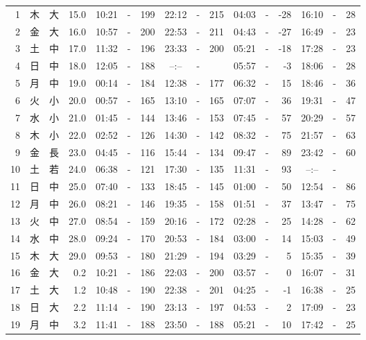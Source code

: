 \documentclass[12pt.a4j]{jsarticle}
\begin{document}
\begin{center}
\begin{table}[ht]
\begin{tabular}{|rc|cr|ccrccr|ccrccr|}
 \hline
 1 & 木 & 大 & 15.0 &  10:21 &-& 199  &  22:12 &-& 215  &   04:03 &-& -28  &   16:10 &-&  28  \\
 2 & 金 & 大 & 16.0 &  10:57 &-& 200  &  22:53 &-& 211  &   04:43 &-& -27  &   16:49 &-&  23  \\
 3 & 土 & 中 & 17.0 &  11:32 &-& 196  &  23:33 &-& 200  &   05:21 &-& -18  &   17:28 &-&  23  \\
 4 & 日 & 中 & 18.0 &  12:05 &-& 188  &  --:-- &-&     &   05:57 &-&  -3  &   18:06 &-&  28  \\
 5 & 月 & 中 & 19.0 &  00:14 &-& 184  &  12:38 &-& 177  &   06:32 &-&  15  &   18:46 &-&  36  \\
 6 & 火 & 小 & 20.0 &  00:57 &-& 165  &  13:10 &-& 165  &   07:07 &-&  36  &   19:31 &-&  47  \\
 7 & 水 & 小 & 21.0 &  01:45 &-& 144  &  13:46 &-& 153  &   07:45 &-&  57  &   20:29 &-&  57  \\
 8 & 木 & 小 & 22.0 &  02:52 &-& 126  &  14:30 &-& 142  &   08:32 &-&  75  &   21:57 &-&  63  \\
 9 & 金 & 長 & 23.0 &  04:45 &-& 116  &  15:44 &-& 134  &   09:47 &-&  89  &   23:42 &-&  60  \\
10 & 土 & 若 & 24.0 &  06:38 &-& 121  &  17:30 &-& 135  &   11:31 &-&  93  &   --:-- &-&     \\
11 & 日 & 中 & 25.0 &  07:40 &-& 133  &  18:45 &-& 145  &   01:00 &-&  50  &   12:54 &-&  86  \\
12 & 月 & 中 & 26.0 &  08:21 &-& 146  &  19:35 &-& 158  &   01:51 &-&  37  &   13:47 &-&  75  \\
13 & 火 & 中 & 27.0 &  08:54 &-& 159  &  20:16 &-& 172  &   02:28 &-&  25  &   14:28 &-&  62  \\
14 & 水 & 中 & 28.0 &  09:24 &-& 170  &  20:53 &-& 184  &   03:00 &-&  14  &   15:03 &-&  49  \\
15 & 木 & 大 & 29.0 &  09:53 &-& 180  &  21:29 &-& 194  &   03:29 &-&   5  &   15:35 &-&  39  \\
16 & 金 & 大 &  0.2 &  10:21 &-& 186  &  22:03 &-& 200  &   03:57 &-&   0  &   16:07 &-&  31  \\
17 & 土 & 大 &  1.2 &  10:48 &-& 190  &  22:38 &-& 201  &   04:25 &-&  -1  &   16:38 &-&  25  \\
18 & 日 & 大 &  2.2 &  11:14 &-& 190  &  23:13 &-& 197  &   04:53 &-&   2  &   17:09 &-&  23  \\
19 & 月 & 中 &  3.2 &  11:41 &-& 188  &  23:50 &-& 188  &   05:21 &-&  10  &   17:42 &-&  25  \\

\end{tabular}
\end{table}
\end{center}
\end{document}
